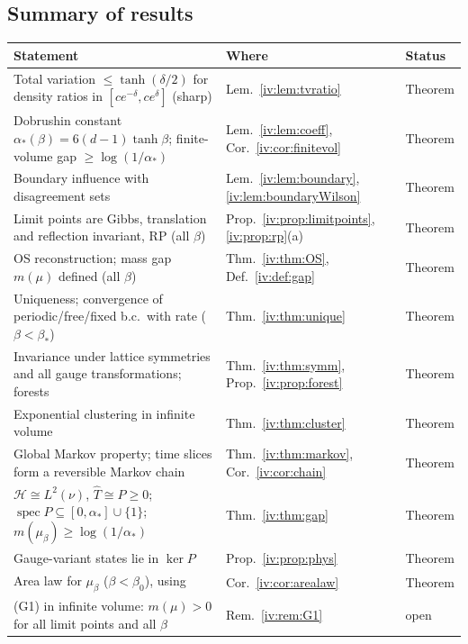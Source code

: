 \documentclass[11pt,a4paper]{article}
\theoremstyle{definition}
\theoremstyle{remark}
\DeclareMathOperator{\spec}{spec}
\newcommand{\cH}{\mathcal{H}}
\newcommand{\hT}{\hat{T}}
\newcommand{\aS}{\alpha_*}
\newcommand{\bS}{\beta_*}
\begin{document}
\subsection*{Summary of results}

\begin{center}
\small
\begin{tabular}{@{}p{}p{}l@{}}
\toprule
Statement & Where & Status\\
\midrule
Total variation $\le\tanh(\delta/2)$ for density ratios in $[ce^{-\delta},ce^{\delta}]$ (sharp) & Lem.~\ref{iv:lem:tvratio} & Theorem\\
Dobrushin constant $\aS(\beta)=6(d-1)\tanh\beta$; finite-volume gap $\ge\log(1/\aS)$ & Lem.~\ref{iv:lem:coeff}, Cor.~\ref{iv:cor:finitevol} & Theorem\\
Boundary influence with disagreement sets & Lem.~\ref{iv:lem:boundary}, \ref{iv:lem:boundaryWilson} & Theorem\\
Limit points are Gibbs, translation and reflection invariant, RP (all $\beta$) & Prop.~\ref{iv:prop:limitpoints}, \ref{iv:prop:rp}(a) & Theorem\\
OS reconstruction; mass gap $m(\mu)$ defined (all $\beta$) & Thm.~\ref{iv:thm:OS}, Def.~\ref{iv:def:gap} & Theorem\\
Uniqueness; convergence of periodic/free/fixed b.c.\ with rate ($\beta<\bS$) & Thm.~\ref{iv:thm:unique} & Theorem\\
Invariance under lattice symmetries and all gauge transformations; forests & Thm.~\ref{iv:thm:symm}, Prop.~\ref{iv:prop:forest} & Theorem\\
Exponential clustering in infinite volume & Thm.~\ref{iv:thm:cluster} & Theorem\\
Global Markov property; time slices form a reversible Markov chain & Thm.~\ref{iv:thm:markov}, Cor.~\ref{iv:cor:chain} & Theorem\\
$\cH\cong L^2(\nu)$, $\hT\cong P\ge0$; $\spec P\subseteq[0,\aS]\cup\{1\}$; $m(\mu_\beta)\ge\log(1/\aS)$ & Thm.~\ref{iv:thm:gap} & Theorem\\
Gauge-variant states lie in $\ker P$ & Prop.~\ref{iv:prop:phys} & Theorem\\
Area law for $\mu_\beta$ ($\beta<\beta_0$), using \cite{III} & Cor.~\ref{iv:cor:arealaw} & Theorem\\
(G1) in infinite volume: $m(\mu)>0$ for all limit points and all $\beta$ & Rem.~\ref{iv:rem:G1} & open\\
\bottomrule
\end{tabular}
\end{center}
\end{document}
